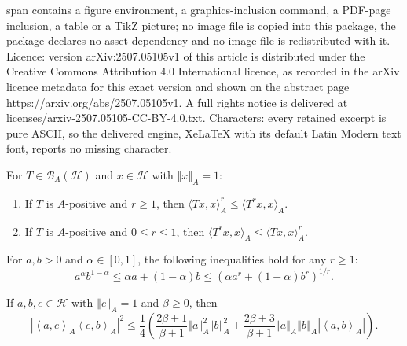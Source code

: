 \documentclass[10pt,a4paper]{amsart}
\newcommand {\h}{\mathcal{H}}
\newcommand{\abs}[1]{\left\vert#1\right\vert}
\newcommand{\bra}[1]{\left(#1\right)}
\newcommand{\normA}[1]{{\left\Vert#1\right\Vert}_{A}}
\newcommand{\norm}[1]{\left\Vert#1\right\Vert}
\newcommand{\seqA}[1]{{\left<#1\right>}_{A}}
\begin{document}
span contains a figure environment, a graphics-inclusion command, a PDF-page inclusion, a table or a TikZ picture; no image file is copied into this package, the package declares no asset dependency and no image file is redistributed with it. Licence: version arXiv:2507.05105v1 of this article is distributed under the Creative Commons Attribution 4.0 International licence, as recorded in the arXiv licence metadata for this exact version and shown on the abstract page https://arxiv.org/abs/2507.05105v1. A full rights notice is delivered at licenses/arxiv-2507.05105-CC-BY-4.0.txt. Characters: every retained excerpt is pure ASCII, so the delivered engine, XeLaTeX with its default Latin Modern text font, reports no missing character.
\begin{lemma}
\label{lem:holder_mccarthy}
For $T \in \mathcal{B}_A(\mathcal{H})$ and $x \in \mathcal{H}$ with $\norm{x}_A = 1$:
\begin{enumerate}
    \item If $T$ is $A$-positive and $r \geq 1$, then $\langle Tx, x \rangle_A^r \leq \langle T^rx, x \rangle_A$.
    \item If $T$ is $A$-positive and $0 \leq r \leq 1$, then $\langle T^rx, x \rangle_A \leq \langle Tx, x \rangle_A^r$.
\end{enumerate}
\end{lemma}

\begin{lemma}
\label{lem:jensen}
For $a, b > 0$ and $\alpha \in [0, 1]$, the following inequalities hold for any $r \geq 1$:
\[
a^\alpha b^{1-\alpha} \leq \alpha a + (1-\alpha)b \leq \left(\alpha a^r + (1-\alpha)b^r\right)^{1/r}.
\]
\end{lemma}

\begin{lemma}\label{Buzano} If $a,b,e\in\h$ with $\normA{e}=1$ and $\beta\geq 0$, then
\begin{equation}\label{Imediae1}
  \abs{\seqA{a,e}\seqA{e,b}}^2\leq \frac{1}{4}\bra{\frac{2\beta+1}{\beta+1}\normA{a}^2\normA{b}^2+\frac{2\beta+3}{\beta+1}\normA{a}\normA{b}\abs{\seqA{a,b}}}.
\end{equation}
\end{lemma}
\end{document}
